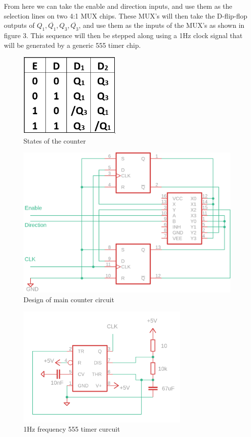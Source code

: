 \documentclass[a4paper,11pt]{article}
\begin{document}
From here we can take the enable and direction inputs, and use them as the selection lines on two 4:1 MUX chips. These MUX's will then take the D-flip-flop outputs of $Q_{1}, \overline{Q_{1}}, Q_{3}, \overline{Q_{3}}$, and use them as the inputs of the MUX's as shown in figure 3. This sequence will then be stepped along using a 1Hz clock signal that will be generated by a generic 555 timer chip.
\begin{figure}[h]
\centering
\includegraphics[width = 5cm]{mux_table.png}
\caption{States of the counter}
\end{figure}
\newpage
\begin{figure}[h]
\centering
\includegraphics[width = \linewidth]{circuit.png}
\caption{Design of main counter circuit}
\end{figure}
\begin{figure}[h]
\centering
\includegraphics[width = 8.5cm]{CLK_timer.png}
\caption{1Hz frequency 555 timer curcuit}
\end{figure}
\end{document}
